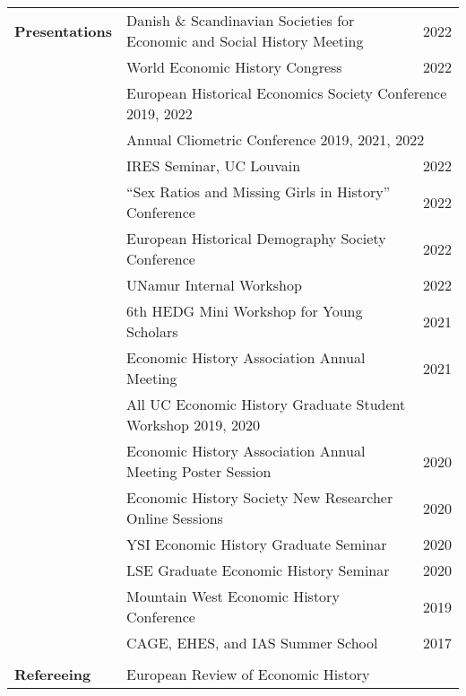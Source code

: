 \documentclass[a4paper,11pt,oneside]{article}
\begin{document}
\begin{longtable}{@{} p{0.175\linewidth} p{0.775\linewidth} p{0.05\linewidth}}
 \textbf{\large{Presentations}}    & Danish  \& Scandinavian Societies for Economic and Social History Meeting &  \hfill 2022  \\
 & World Economic History Congress & \hfill 2022 \\
 & \multicolumn{2}{l}{  European Historical Economics Society Conference   \hfill 2019, 2022} \\
 & \multicolumn{2}{l}{ Annual Cliometric Conference    \hfill 2019, 2021, 2022} \\
 & IRES Seminar, UC Louvain & \hfill 2022 \\
 &  ``Sex Ratios and Missing Girls in History'' Conference & \hfill 2022\\
 & European Historical Demography Society Conference & \hfill 2022 \\
 & UNamur Internal Workshop & \hfill 2022 \\
 &   6th HEDG Mini Workshop for Young Scholars   & \hfill 2021\\
 &   Economic History Association Annual Meeting   & \hfill 2021\\
 & \multicolumn{2}{l}{ All UC Economic History Graduate Student Workshop  \hfill 2019, 2020}\\

   &  Economic History Association Annual Meeting Poster Session & \hfill  2020\\
   &  Economic History Society New Researcher Online Sessions & \hfill 2020\\
  &  YSI Economic History Graduate Seminar & \hfill 2020\\
   &  LSE Graduate Economic History Seminar & \hfill  2020\\
     &  Mountain West Economic History Conference  & \hfill  2019\\
     &  CAGE, EHES, and IAS Summer School  & \hfill  2017\\
     \\
     \textbf{\large{Refereeing}}   &   European Review of Economic History &\\

   
    \end{longtable}
\end{document}
